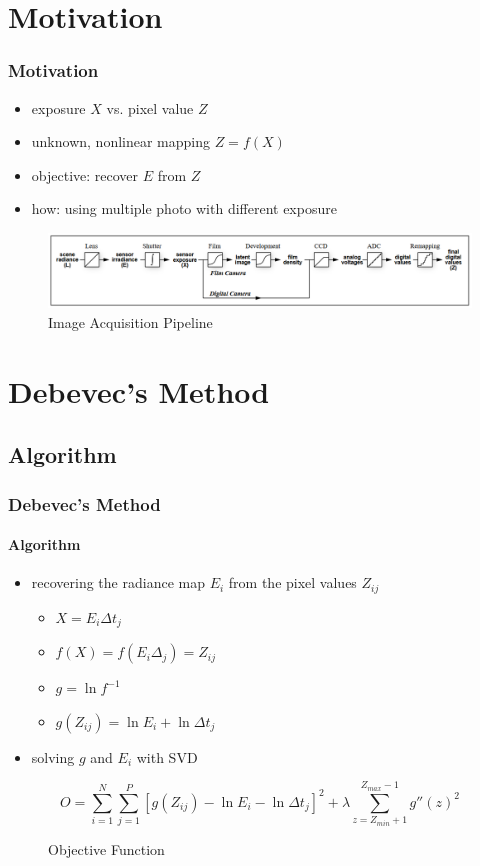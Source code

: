 \documentclass[
	11pt, %
	aspectratio=169, %
]{beamer}
\begin{document}
\section{Motivation}

\begin{frame}
	\frametitle{Motivation}

	\begin{itemize}
		\item exposure $X$ vs. pixel value $Z$
		\item unknown, nonlinear mapping $Z = f(X)$
		\item objective: recover $E$ from $Z$
		\item how: using multiple photo with different exposure
	\end{itemize}
	
	\begin{figure}
		\includegraphics[width=0.8\linewidth]{./Images/camera_pipeline.png}
		\caption{Image Acquisition Pipeline}
	\end{figure}

\end{frame}

\section{Debevec's Method}
\subsection{Algorithm}

\begin{frame}
	\frametitle{Debevec's Method}
	\framesubtitle{Algorithm}

	\begin{itemize}
		\item recovering the radiance map $E_i$ from the pixel values $Z_{ij}$
		\begin{itemize} 
			\item $X = E_i \Delta t_j$
			\item $f(X) = f(E_i \Delta_j) = Z_{ij}$
			\item $g = \ln f^{-1}$
			\item $g(Z_{ij}) = \ln E_i + \ln \Delta t_j$
		\end{itemize}
		\item solving $g$ and $E_i$ with SVD
	\end{itemize}

	\begin{figure}
		$$O = \sum _{i=1}^{N} \sum_{j=1}^{P} \left[g(Z_{ij}) - \ln E_i - \ln \Delta t_j\right]^{2} 
			+ \lambda \sum_{z = Z_{min} + 1}^{Z_{max} - 1} g''(z)^{2}$$
		\caption{Objective Function}
	\end{figure}
\end{frame}
\end{document}
